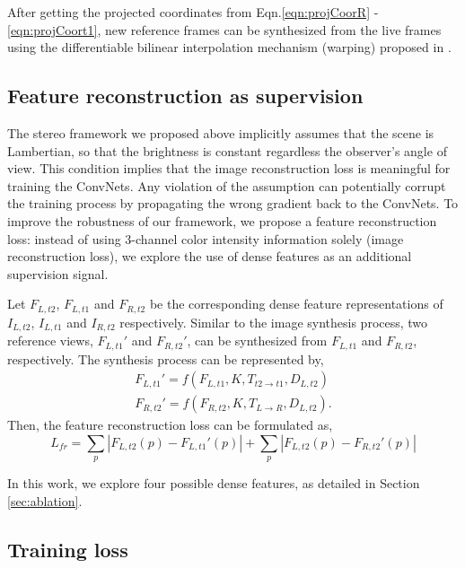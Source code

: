 \documentclass[10pt,twocolumn,letterpaper]{article}
\begin{document}
After getting the projected coordinates from Eqn.\ref{eqn:projCoorR} - \ref{eqn:projCoort1}, new reference frames can be synthesized from the live frames using the differentiable bilinear interpolation mechanism (warping) proposed in \cite{jaderberg2015stn}. 

\subsection{Feature reconstruction as supervision}\label{sec:method_featSuper}
The stereo framework we proposed above implicitly assumes that the scene is Lambertian, so that the brightness is constant regardless the observer's angle of view. This condition implies that the image reconstruction loss is meaningful for training the ConvNets.
Any violation of the assumption can potentially corrupt the training process by propagating the wrong gradient back to the ConvNets. 
To improve the robustness of our framework, we propose a feature reconstruction loss: 
instead of using 3-channel color intensity information solely (image reconstruction loss), we explore the use of dense features as an additional supervision signal. 


Let $F_{L,t2}$, $F_{L,t1}$ and $F_{R,t2}$ be the corresponding dense feature representations of $I_{L,t2}$, $I_{L,t1}$ and $I_{R,t2}$ respectively. 
Similar to the image synthesis process, two reference views, $F_{L,t1}'$ and $F_{R,t2}'$, can be synthesized from $F_{L,t1}$ and $F_{R,t2}$, respectively.
The synthesis process can be represented by, 
% 
\begin{align}
    F_{L,t1}' = f(F_{L,t1}, K, T_{t2 \rightarrow t1}, D_{L,t2}) \label{eqn:synFeat1} \\
    F_{R,t2}' = f(F_{R,t2}, K, T_{L \rightarrow R}, D_{L,t2}).
    \label{eqn:synFeat2}
\end{align}
% 
Then, the feature reconstruction loss can be formulated as,
% 
\begin{equation} 
    L_{fr} = \sum_{p}{|F_{L,t2}(p) - F_{L,t1}'(p)|} 
    +\sum_{p}{|F_{L,t2}(p) - F_{R,t2}'(p)|} \label{eqn:featLoss} 
\end{equation}

In this work, we explore four possible dense features, as detailed in Section \ref{sec:ablation}.


\subsection{Training loss} \label{sec:method_loss}
\end{document}
